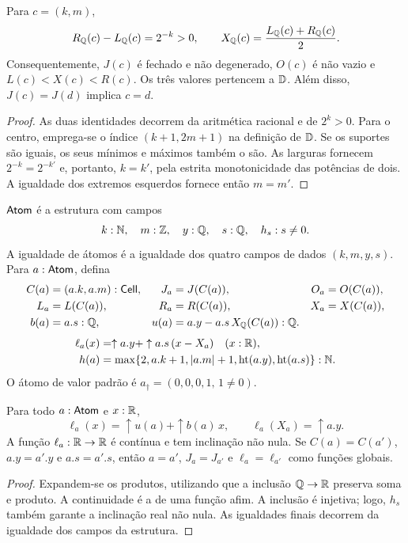 \begin{lema}\label{map:normalizacao:2.3}\label{normalizacao:lem:geometry}
Para $c=(k,m)$,
\[
 R_\mathbb Q(c)-L_\mathbb Q(c)=2^{-k}>0,\qquad
 X_\mathbb Q(c)=\frac{L_\mathbb Q(c)+R_\mathbb Q(c)}2.
\]
Consequentemente, $J(c)$ é fechado e não degenerado, $O(c)$ é não
vazio e $L(c)<X(c)<R(c)$. Os três valores pertencem a $\mathbb D$.
Além disso, $J(c)=J(d)$ implica $c=d$.
\end{lema}
\begin{proof}
As duas identidades decorrem da aritmética racional e de $2^k>0$.
Para o centro, emprega-se o índice $(k+1,2m+1)$ na definição de $\mathbb D$.
Se os suportes são iguais, os seus mínimos e máximos também o são.
As larguras fornecem $2^{-k}=2^{-k'}$ e, portanto, $k=k'$, pela estrita
monotonicidade das potências de dois. A igualdade dos extremos
esquerdos fornece então $m=m'$.
\end{proof}

\begin{definicao}\label{map:normalizacao:2.4}\label{normalizacao:def:atom}
$\mathsf{Atom}$ é a estrutura com campos
\[
 k:\mathbb N,\quad m:\mathbb Z,\quad y:\mathbb Q,\quad s:\mathbb Q,\quad h_s:s\ne0.
\]
A igualdade de átomos é a igualdade dos quatro campos de dados
$(k,m,y,s)$. Para $a:\mathsf{Atom}$, defina
\begin{align*}
 C(a)&=(a.k,a.m):\mathsf{Cell}, & J_a&=J(C(a)), & O_a&=O(C(a)),\\
 L_a&=L(C(a)),&R_a&=R(C(a)),&X_a&=X(C(a)),\\
 b(a)&=a.s:\mathbb Q,& u(a)&=a.y-a.s\,X_\mathbb Q(C(a)):\mathbb Q.
\end{align*}
\begin{align*}
 \ell_a(x)&=\uparrow a.y+\uparrow a.s\,(x-X_a)\quad(x:\mathbb R),\\
 h(a)&=\max\{2,a.k+1,|a.m|+1,\operatorname{ht}(a.y),\operatorname{ht}(a.s)\}:\mathbb N.
\end{align*}
O átomo de valor padrão é
$a_\dagger=(0,0,0,1,\,1\ne0)$.
\end{definicao}

\begin{lema}\label{map:normalizacao:2.5}\label{normalizacao:lem:line}
Para todo $a:\mathsf{Atom}$ e $x:\mathbb R$,
\[
 \ell_a(x)=\uparrow u(a)+\uparrow b(a)\,x,\qquad
 \ell_a(X_a)=\uparrow a.y.
\]
A função $\ell_a:\mathbb R\to\mathbb R$ é contínua e tem inclinação não nula.
Se $C(a)=C(a')$, $a.y=a'.y$ e $a.s=a'.s$, então
$a=a'$, $J_a=J_{a'}$ e $\ell_a=\ell_{a'}$ como funções globais.
\end{lema}
\begin{proof}
Expandem-se os produtos, utilizando que a inclusão $\mathbb Q\to\mathbb R$ preserva soma
e produto. A continuidade é a de uma função afim. A inclusão é
injetiva; logo, $h_s$ também garante a inclinação real não nula.
As igualdades finais decorrem da igualdade dos campos da estrutura.
\end{proof}

